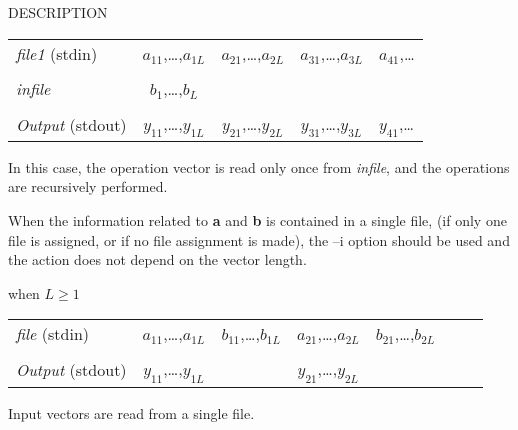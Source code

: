 \begin{qsection}{DESCRIPTION}
\begin{description}
\begin{tabular}{l|c|c|c|l}
{\em file1} (stdin)     & {$a_{11}$,\dots,$a_{1L}$}
                        & {$a_{21}$,\dots,$a_{2L}$}
                        & {$a_{31}$,\dots,$a_{3L}$}
                        & {$a_{41}$,\dots} \\ \cline{2-5}
\multicolumn{5}{c}{}    \\[-10pt]
                        \cline{2-2}
{\em infile}            & {$b_{1}$,\dots,$b_{L}$}
                        & \multicolumn{3}{c}{} \\ \cline{2-2}
\multicolumn{5}{c}{}    \\[-10pt]
                        \cline{2-5}                     
{\em Output} (stdout)   & {$y_{11}$,\dots,$y_{1L}$}
                        & {$y_{21}$,\dots,$y_{2L}$}
                        & {$y_{31}$,\dots,$y_{3L}$}
                        & {$y_{41}$,\dots} \\ \cline{2-5}
\end{tabular}
\par
In this case, the operation vector is read only once from
{\em infile}, and the operations are recursively performed.
\end{description}
\par
When the information related to {\bf a} and {\bf b} is contained
in a single file,
(if only one file is assigned,
or if no file assignment is made),
the --i option should be used
and the action does not depend on the vector length.
\begin{description}
\item{when $L\geq 1$}~\\
\begin{tabular}{l|c|c|c|c|l} \cline{2-6}
{\em file} (stdin)      & {$a_{11}$,\dots,$a_{1L}$}
                        & {$b_{11}$,\dots,$b_{1L}$}
                        & {$a_{21}$,\dots,$a_{2L}$}
                        & {$b_{21}$,\dots,$b_{2L}$}
                        & ~~~ \\ \cline{2-6}
\multicolumn{6}{c}{}    \\[-10pt]
                        \cline{2-2} \cline{4-4} \cline{6-6}
{\em Output} (stdout)   & {$y_{11}$,\dots,$y_{1L}$} &
                        & {$y_{21}$,\dots,$y_{2L}$} &
                        & ~~~ \\
                        \cline{2-2} \cline{4-4} \cline{6-6}
\end{tabular}
\par
Input vectors are read from a single file.
\end{description}
\end{qsection}

